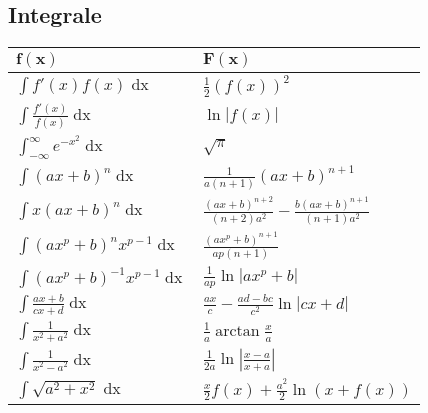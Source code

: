 \documentclass[a4paper,10pt]{article}
\renewcommand*{\arraystretch}{2}
\begin{document}
\subsection{Integrale}
\begin{center}
	\begin{tabularx}{\linewidth}{>{\centering\arraybackslash}X>{\centering\arraybackslash}X}
		\toprule
		$\mathbf{f(x)}$                              & $\mathbf{F(x)}$                                                  \\
		\midrule
		$\int f'(x) f(x) \mathop{dx}$                & $\frac{1}{2}(f(x))^2$                                            \\
		$\int \frac{f'(x)}{f(x)} \mathop{dx}$        & $\ln|f(x)|$                                                      \\
		$\int_{-\infty}^\infty e^{-x^2} \mathop{dx}$ & $\sqrt{\pi}$                                                     \\
		$\int (ax+b)^n \mathop{dx}$                  & $\frac{1}{a(n+1)}(ax+b)^{n+1}$                                   \\
		$\int x(ax+b)^n \mathop{dx}$                 & $\frac{(ax+b)^{n+2}}{(n+2)a^2} - \frac{b(ax+b)^{n+1}}{(n+1)a^2}$ \\
		$\int (ax^p+b)^n x^{p-1} \mathop{dx}$        & $\frac{(ax^p+b)^{n+1}}{ap(n+1)}$                                 \\
		$\int (ax^p + b)^{-1} x^{p-1} \mathop{dx}$   & $\frac{1}{ap} \ln |ax^p + b|$                                    \\
		$\int \frac{ax+b}{cx+d} \mathop{dx}$         & $\frac{ax}{c} - \frac{ad-bc}{c^2} \ln |cx +d|$                   \\
		$\int \frac{1}{x^2+a^2} \mathop{dx}$         & $\frac{1}{a} \arctan \frac{x}{a}$                                \\
		$\int \frac{1}{x^2 - a^2} \mathop{dx}$       & $\frac{1}{2a} \ln\left| \frac{x-a}{x+a} \right|$                 \\
		$\int \sqrt{a^2+x^2} \mathop{dx} $           & $\frac{x}{2}f(x) + \frac{a^2}{2}\ln(x+f(x))$                     \\
		\bottomrule
	\end{tabularx}
\end{center}
\clearpage

\renewcommand*{\arraystretch}{2.5}
\end{document}
